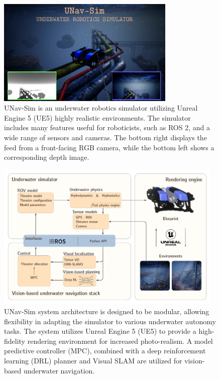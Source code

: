 



\begin{figure}[t]
    \centering
    \includegraphics[width=8.5cm]{figures/UWRS_pipe.pdf}
    \caption{UNav-Sim is an underwater robotics simulator utilizing Unreal Engine 5 (UE5) highly realistic environments. The simulator includes many features useful for roboticists, such as ROS 2, and a wide range of sensors and cameras. The bottom right displays the feed from a front-facing RGB camera, while the bottom left shows a corresponding depth image.}
    \label{fig:uwrs}
\end{figure}



\begin{figure}[!t]
    \centering
    \includegraphics[width=0.97\textwidth]{figures/abstract4.pdf}
    \caption{UNav-Sim system architecture is designed to be modular, allowing flexibility in adapting the simulator to various underwater autonomy tasks. The system utilizes Unreal Engine 5 (UE5) to provide a high-fidelity rendering environment for increased photo-realism.  A model predictive controller (MPC), combined with a deep reinforcement learning (DRL) planner and Visual \ac{SLAM} are utilized for vision-based underwater navigation.   }
    \label{fig:abstract} 
\end{figure}



